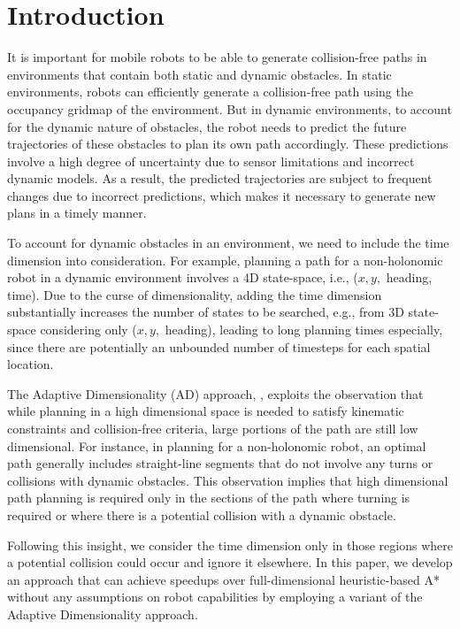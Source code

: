 
\section{Introduction}
\label{sec:ppad-introduction}

It is important for mobile robots to be able to generate collision-free paths in environments that contain both static and dynamic obstacles.
In static environments, robots can efficiently generate a collision-free path using the occupancy gridmap of the environment. But in dynamic environments, to account for the dynamic nature of obstacles, the robot needs to predict the future trajectories of these obstacles to plan its own path accordingly. These predictions involve a high degree of uncertainty due to sensor limitations and incorrect dynamic models. As a result, the predicted trajectories are subject to frequent changes due to incorrect predictions, which makes it necessary to generate new plans in a timely manner.

To account for dynamic obstacles in an environment, we need to include the time dimension into consideration. 
For example, planning a path for a non-holonomic robot in a dynamic environment involves a 4D state-space, i.e., ($x, y,$ heading, time). 
Due to the curse of dimensionality, adding the time dimension substantially increases the number of states to be searched, e.g., from 3D state-space considering only ($x, y,$ heading), leading to long planning times especially, since there are potentially an unbounded number of timesteps for each spatial location.  


The Adaptive Dimensionality (AD) approach, \cite{gochev2011path}, exploits the observation that while planning in a high dimensional space is needed to satisfy kinematic constraints and collision-free criteria, large portions of the path are still low dimensional. For instance, in planning for a non-holonomic robot, an optimal path generally includes straight-line segments that do not involve any turns or collisions with dynamic obstacles. This observation implies that high dimensional path planning is required only in the sections of the path where turning is required or where there is a potential collision with a dynamic obstacle. 

Following this insight, we consider the time dimension only in those regions where a potential collision could occur and ignore it elsewhere. In this paper, we develop an approach that can achieve speedups over full-dimensional heuristic-based A* without any assumptions on robot capabilities by employing a variant of the Adaptive Dimensionality approach.

